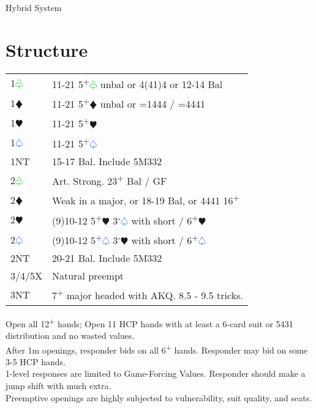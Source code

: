 \documentclass{article}
\renewcommand{\sp}{\textcolor{RoyalBlue}{$\varspade$}}
\newcommand{\he}{\textcolor{RubineRed}{$\varheart$}}
\newcommand{\di}{\textcolor{Peach}{$\vardiamond$}}
\newcommand{\cl}{\textcolor{LimeGreen}{$\varclub$}}
\newcommand{\nt}{\relsize{-1}NT\relsize{1}}
\newcommand{\up}{\textsuperscript{+}}
\newcommand{\down}{\textsuperscript{-}}
\begin{document}
\normalfont
\twocolumn
\setlength{\columnseprule}{0.5pt}
\Large{Hybrid System}
\normalsize
\tableofcontents

\vfill\eject

\section{Structure}

\begin{tabular}{|l|p{6.5cm}}
 1\cl{} & 11-21 5\up\cl{} unbal or 4(41)4 or 12-14 Bal \\
 1\di{} & 11-21 5\up\di{} unbal or =1444 / =4441 \\
 1\he{} & 11-21 5\up\he{} \\
 1\sp{} & 11-21 5\up\sp{} \\
 1\nt{} & 15-17 Bal. Include 5M332 \\
 2\cl{} & Art. Strong. 23\up{} Bal / GF \\
 2\di{} & Weak in a major, or 18-19 Bal, or 4441 16\up{} \\
 2\he{} & (9)10-12 5\up\he{} 3\down{}\sp{} with short / 6\up{}\he \\
 2\sp{} & (9)10-12 5\up\sp{} 3\down{}\he{} with short / 6\up{}\sp \\
 2\nt & 20-21 Bal. Include 5M332 \\
 3/4/5X & Natural preempt \\
 3\nt & 7\up{} major headed with AKQ. 8.5 - 9.5 tricks. \\
\end{tabular}

\medskip

Open all 12\up{} hands; Open 11 HCP hands with at least a 6-card suit or 5431 distribution and no wasted values. \\

After 1m openings, responder bids on all 6\up{} hands. Responder may bid on some 3-5 HCP hands. \\

1-level responses are limited to Game-Forcing Values. Responder should make a jump shift with much extra. \\

Preemptive openings are highly subjected to vulnerability, suit quality, and seats.
\end{document}
